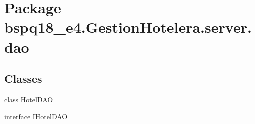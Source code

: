 \hypertarget{namespacebspq18__e4_1_1_gestion_hotelera_1_1server_1_1dao}{}\section{Package bspq18\+\_\+e4.\+Gestion\+Hotelera.\+server.\+dao}
\label{namespacebspq18__e4_1_1_gestion_hotelera_1_1server_1_1dao}
\subsection*{Classes}
\begin{DoxyCompactItemize}
\item 
class \mbox{\hyperlink{classbspq18__e4_1_1_gestion_hotelera_1_1server_1_1dao_1_1_hotel_d_a_o}{Hotel\+D\+AO}}
\item 
interface \mbox{\hyperlink{interfacebspq18__e4_1_1_gestion_hotelera_1_1server_1_1dao_1_1_i_hotel_d_a_o}{I\+Hotel\+D\+AO}}
\end{DoxyCompactItemize}
